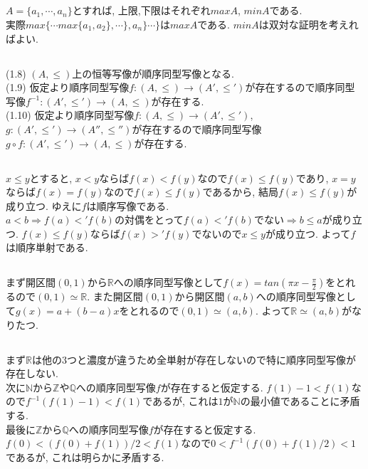 \documentclass{jsarticle}
\begin{document}
\subsection{} %
$A = \{a_1, \cdots, a_n\}$とすれば, 上限,下限はそれぞれ$max A$, $min A$である.\\
実際$max\{ \cdots max\{a_1, a_2\}, \cdots \}, a_n \} \cdots \}$は$max A$である. $min A$は双対な証明を考えればよい.

\subsection{} %
(1.8) $(A, \le)$上の恒等写像が順序同型写像となる.\\
(1.9) 仮定より順序同型写像$f:(A, \le) \rightarrow (A', \le')$が存在するので順序同型写像$f^{-1}:(A', \le') \rightarrow (A, \le)$が存在する.\\
(1.10) 仮定より順序同型写像$f:(A, \le) \rightarrow (A', \le')$, $g:(A', \le') \rightarrow (A'', \le'')$が存在するので順序同型写像$g \circ f:(A', \le') \rightarrow (A, \le)$が存在する.\\

\subsection{} %
$x \le y$とすると, $x < y$ならば$f(x) < f(y)$なので$f(x) \le f(y)$であり, $x = y$ならば$f(x) = f(y)$なので$f(x) \le f(y)$であるから, 結局$f(x) \le f(y)$が成り立つ. ゆえに$f$は順序写像である. \\
$a < b \Rightarrow f(a) <' f(b)$の対偶をとって$f(a) <' f(b)でない \Rightarrow b \le a$が成り立つ. $f(x) \le f(y)$ならば$f(x) >' f(y)$でないので$x \le y$が成り立つ. よって$f$は順序単射である.

\subsection{} %
まず開区間$(0, 1)$から$\mathbb{R}$への順序同型写像として$f(x) = tan(\pi x - \frac{\pi}{2})$をとれるので$(0, 1) \simeq \mathbb{R}$. また開区間$(0, 1)$から開区間$(a, b)$への順序同型写像として$g(x) = a + (b - a)x$をとれるので$(0, 1) \simeq (a, b)$. よって$\mathbb{R} \simeq (a, b)$がなりたつ.

\subsection{} %
まず$\mathbb{R}$は他の3つと濃度が違うため全単射が存在しないので特に順序同型写像が存在しない.\\
次に$\mathbb{N}$から$\mathbb{Z}$や$\mathbb{Q}$への順序同型写像$f$が存在すると仮定する. $f(1) - 1 < f(1)$なので$f^{-1}(f(1) - 1) < f(1)$であるが, これは$1$が$\mathbb{N}$の最小値であることに矛盾する.\\
最後に$\mathbb{Z}$から$\mathbb{Q}$への順序同型写像$f$が存在すると仮定する. $f(0) < (f(0) + f(1)) / 2 < f(1)$なので$0 < f^{-1}(f(0) + f(1) / 2) < 1$であるが, これは明らかに矛盾する.
\end{document}
